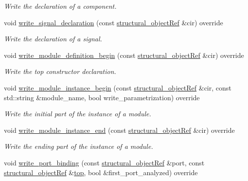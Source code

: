 \begin{DoxyCompactItemize}
\begin{DoxyCompactList}\small\item\em Write the declaration of a component. \end{DoxyCompactList}\item 
void \hyperlink{structVHDL__writer_abbe0d08a850b90049d20cbc3ded0e132}{write\+\_\+signal\+\_\+declaration} (const \hyperlink{structural__objects_8hpp_a8ea5f8cc50ab8f4c31e2751074ff60b2}{structural\+\_\+object\+Ref} \&cir) override
\begin{DoxyCompactList}\small\item\em Write the declaration of a signal. \end{DoxyCompactList}\item 
void \hyperlink{structVHDL__writer_a36282fe093991df0bd1b5c1df8466fd6}{write\+\_\+module\+\_\+definition\+\_\+begin} (const \hyperlink{structural__objects_8hpp_a8ea5f8cc50ab8f4c31e2751074ff60b2}{structural\+\_\+object\+Ref} \&cir) override
\begin{DoxyCompactList}\small\item\em Write the top constructor declaration. \end{DoxyCompactList}\item 
void \hyperlink{structVHDL__writer_ab73e2cc602653d648cb732dc34421854}{write\+\_\+module\+\_\+instance\+\_\+begin} (const \hyperlink{structural__objects_8hpp_a8ea5f8cc50ab8f4c31e2751074ff60b2}{structural\+\_\+object\+Ref} \&cir, const std\+::string \&module\+\_\+name, bool write\+\_\+parametrization) override
\begin{DoxyCompactList}\small\item\em Write the initial part of the instance of a module. \end{DoxyCompactList}\item 
void \hyperlink{structVHDL__writer_a8aac905135d17dd707703da3b73dd6d5}{write\+\_\+module\+\_\+instance\+\_\+end} (const \hyperlink{structural__objects_8hpp_a8ea5f8cc50ab8f4c31e2751074ff60b2}{structural\+\_\+object\+Ref} \&cir) override
\begin{DoxyCompactList}\small\item\em Write the ending part of the instance of a module. \end{DoxyCompactList}\item 
void \hyperlink{structVHDL__writer_ab460a8caf690d621561c8ea8705d7438}{write\+\_\+port\+\_\+binding} (const \hyperlink{structural__objects_8hpp_a8ea5f8cc50ab8f4c31e2751074ff60b2}{structural\+\_\+object\+Ref} \&port, const \hyperlink{structural__objects_8hpp_a8ea5f8cc50ab8f4c31e2751074ff60b2}{structural\+\_\+object\+Ref} \&\hyperlink{tutorial__pact__2019_2Introduction_2second_2module_8c_a363ff33001bb9810eee7a6a61179583b}{top}, bool \&first\+\_\+port\+\_\+analyzed) override

\end{DoxyCompactItemize}
